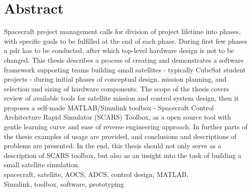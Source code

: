 \section*{Abstract}


Spacecraft project management calls for division of project lifetime into phases, with specific goals to be fulfilled at the end of each phase. During first few phases a \ac*{pdr} has to be conducted, after which top-level hardware design is not to be changed. This thesis describes a process of creating and demonstrates a software framework supporting teams building small satellites - typically CubeSat student projects - during initial phases of conceptual design, mission planning, and selection and sizing of hardware components. The scope of the thesis covers review of available tools for satellite mission and control system design, then it proposes a self-made MATLAB/Simulink toolbox - Spacecraft Control Architecture Rapid Simulator (SCARS) Toolbox, as a open source tool with gentle learning curve and ease of reverse engineering approach. In further parts of the thesis examples of usage are provided, and conclusions and descriptions of problems are presented. In the end, this thesis should not only serve as a description of SCARS toolbox, but also as an insight into the task of building a small satellite simulation.\\[0.3cm]

spacecraft, satellite, AOCS, ADCS, control design, MATLAB,\\ Simulink, toolbox, software, prototyping


